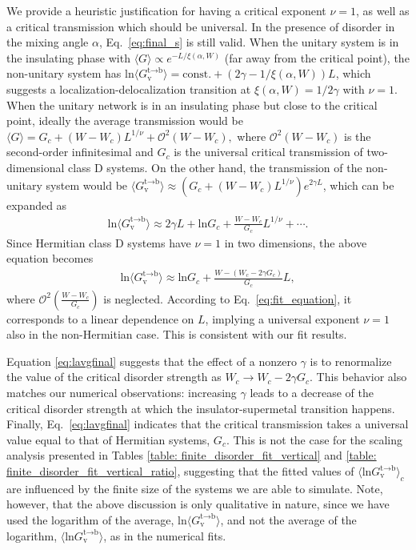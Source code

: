 \documentclass[aps,pra,reprint,superscriptaddress,showkeys,amsmath,amssymb,longbibliography]{revtex4-1}
\begin{document}
We provide a heuristic justification for having a critical exponent $\nu=1$, as well as a critical transmission which should be universal.
In the presence of disorder in the mixing angle $\alpha$, Eq.~\eqref{eq:final_s} is still valid.
When the unitary system is in the insulating phase with $\langle G\rangle\propto
e^{-L/\xi(\alpha,W)}$ (far away from the critical point), the non-unitary system
has $\text{ln}\langle G_{\text{v}}^{\text{t}\rightarrow \text{b}}\rangle = \mathrm{const.} + (2\gamma -1/\xi(\alpha,W))L$, which suggests a localization-delocalization transition at $\xi(\alpha,W)=1/2\gamma$ with $\nu=1$.
When the unitary network is in an insulating phase but close to the critical point, ideally the average transmission would be $\langle G\rangle=G_c+(W-W_c)L^{1/\nu}+\mathcal{O}^2(W-W_c),$ where $\mathcal{O}^2(W-W_c)$ is the second-order infinitesimal and $G_c$ is the universal critical transmission of two-dimensional class D systems. 
On the other hand, the transmission of the non-unitary system would be $\langle G_{\text{v}}^{\text{t}\rightarrow \text{b}}\rangle\approx (G_c+(W-W_c)L^{1/\nu})e^{2\gamma L}$, which can be expanded as
\begin{eqnarray}
\text{ln}\langle G_{\text{v}}^{\text{t}\rightarrow \text{b}}\rangle \approx  2\gamma L + \text{ln}G_c + \frac{W-W_c}{G_c}L^{1/\nu} +\cdots.\label{eq:log_average}
\end{eqnarray}
Since Hermitian class D systems have $\nu=1$ in two dimensions, the above equation becomes
\begin{eqnarray}\label{eq:lavgfinal}
\text{ln}\langle G_{\text{v}}^{\text{t}\rightarrow \text{b}}\rangle \approx \text{ln}G_c + \frac{W- (W_c - 2\gamma G_c)}{G_c}L,
\end{eqnarray} 
where $\mathcal{O}^2(\frac{W-W_c}{G_c})$ is neglected.
According to Eq.~\eqref{eq:fit_equation}, it corresponds to a linear dependence on $L$, implying a universal exponent $\nu=1$ also in the non-Hermitian case.
This is consistent with our fit results.

Equation \eqref{eq:lavgfinal} suggests that the effect of a nonzero $\gamma$ is to renormalize the value of the critical disorder strength as $W_c \to W_c - 2\gamma G_c$. 
This behavior also matches our numerical observations: increasing $\gamma$ leads to a decrease of the critical disorder strength at which the insulator-supermetal transition happens. 
Finally, Eq.~\eqref{eq:lavgfinal} indicates that the critical transmission takes a universal value equal to that of Hermitian systems, $G_c$. 
This is not the case for the scaling analysis presented in Tables \ref{table: finite_disorder_fit_vertical} and \ref{table: finite_disorder_fit_vertical_ratio}, suggesting that the fitted values of 
$\langle\text{ln}G_{\text{v}}^{\text{t}\rightarrow \text{b}}\rangle_c$ are influenced by the finite size of the systems we are able to simulate.
Note, however, that the above discussion is only qualitative in nature, since we
have used the logarithm of the average, $\text{ln}\langle G_{\text{v}}^{\text{t}\rightarrow \text{b}}\rangle$, and not the average of the logarithm, $\langle\text{ln}G_{\text{v}}^{\text{t}\rightarrow \text{b}}\rangle$, as in the numerical fits.
\end{document}
